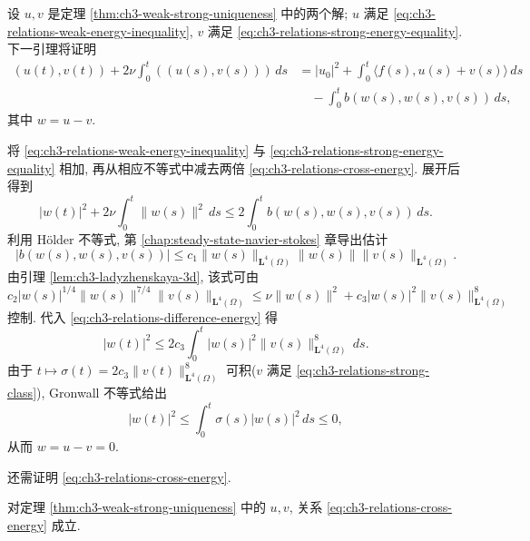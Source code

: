 \hypertarget{chapter-03-page-225}{}
\begin{Proof}
设 $u,v$ 是定理 \ref{thm:ch3-weak-strong-uniqueness} 中的两个解; $u$ 满足 \eqref{eq:ch3-relations-weak-energy-inequality}, $v$ 满足 \eqref{eq:ch3-relations-strong-energy-equality}. 下一引理将证明
\begin{equation}
\begin{aligned}
(u(t),v(t))+2\nu\int_0^t((u(s),v(s)))\,ds
&=|u_0|^2+\int_0^t\langle f(s),u(s)+v(s)\rangle\,ds\\
&\quad-\int_0^t b(w(s),w(s),v(s))\,ds,
\end{aligned}
\label{eq:ch3-relations-cross-energy}
\end{equation}
其中 $w=u-v$.

将 \eqref{eq:ch3-relations-weak-energy-inequality} 与 \eqref{eq:ch3-relations-strong-energy-equality} 相加, 再从相应不等式中减去两倍 \eqref{eq:ch3-relations-cross-energy}. 展开后得到
\begin{equation}
|w(t)|^2+2\nu\int_0^t\lVert w(s)\rVert^2\,ds
\leq2\int_0^t b(w(s),w(s),v(s))\,ds.
\label{eq:ch3-relations-difference-energy}
\end{equation}
利用 Hölder 不等式, 第 \ref{chap:steady-state-navier-stokes} 章导出估计
\[
|b(w(s),w(s),v(s))|
\leq c_1\lVert w(s)\rVert_{\mathbf L^4(\Omega)}
\lVert w(s)\rVert\lVert v(s)\rVert_{\mathbf L^4(\Omega)}.
\]
由引理 \ref{lem:ch3-ladyzhenskaya-3d}, 该式可由
\[
c_2|w(s)|^{1/4}\lVert w(s)\rVert^{7/4}
\lVert v(s)\rVert_{\mathbf L^4(\Omega)}
\leq\nu\lVert w(s)\rVert^2
+c_3|w(s)|^2\lVert v(s)\rVert_{\mathbf L^4(\Omega)}^8
\]
控制. 代入 \eqref{eq:ch3-relations-difference-energy} 得
\[
|w(t)|^2\leq2c_3\int_0^t|w(s)|^2
\lVert v(s)\rVert_{\mathbf L^4(\Omega)}^8\,ds.
\]
由于 $t\mapsto\sigma(t)=2c_3\lVert v(t)\rVert_{\mathbf L^4(\Omega)}^8$ 可积($v$ 满足 \eqref{eq:ch3-relations-strong-class}), Gronwall 不等式给出
\[
|w(t)|^2\leq\int_0^t\sigma(s)|w(s)|^2\,ds\leq0,
\]
从而 $w=u-v=0$.
\end{Proof}

还需证明 \eqref{eq:ch3-relations-cross-energy}.

\begin{Lemma}
\label{lem:ch3-relations-cross-energy}
对定理 \ref{thm:ch3-weak-strong-uniqueness} 中的 $u,v$, 关系 \eqref{eq:ch3-relations-cross-energy} 成立.
\end{Lemma}

